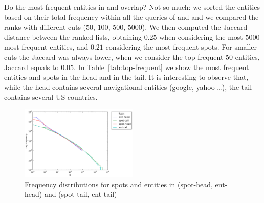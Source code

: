 Do the most frequent entities in \ehead{} and \etail{} overlap? Not so much: we sorted the entities
based on their total frequency within all the queries of \head{} and \tail{} and we compared
the ranks with different cuts ($50$, $100$, $500$, $5000$). We then computed the Jaccard distance
between the ranked lists, obtaining $0.25$ when considering the most $5000$ most frequent entities,
and $0.21$ considering the most frequent spots. For smaller cuts the Jaccard was always lower, 
when we consider the top frequent $50$ entities, Jaccard equals to $0.05$. In Table~\ref{tab:top-frequent}
we show the most frequent entities and spots in the head and in the tail. It is interesting to 
observe that, while the head contains several navigational entities (google, yahoo \dots), the 
tail contains several US countries.

\begin{figure}
  \centering
    \includegraphics[width = 0.5\textwidth]{images/head-tail-ent-spot-dist.png}
	\caption{Frequency distributions for spots and entities in \head{} (spot-head, ent-head) and \tail{} (spot-tail, ent-tail)}
\label{img:distributions}
\end{figure}













